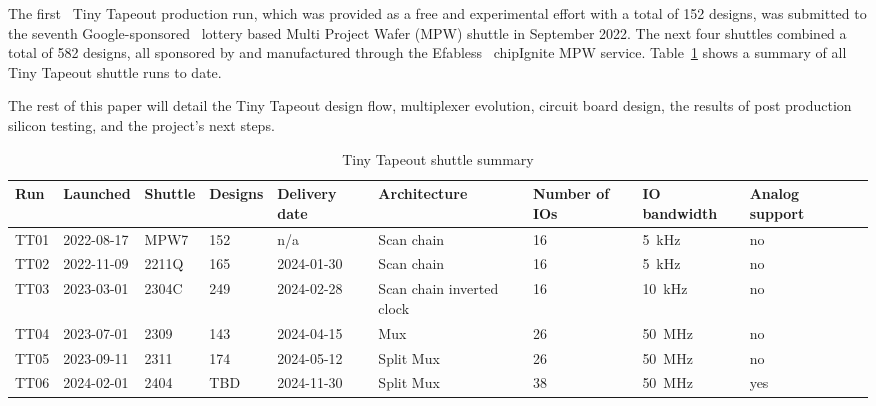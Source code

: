 The first~\cite{firstshuttle} Tiny Tapeout production run, which was provided as a free and experimental effort with a total of 152 designs, was submitted to the seventh Google-sponsored~\cite{googlesponsored} lottery based Multi Project Wafer (MPW) shuttle in September 2022.
The next four shuttles combined a total of 582 designs, all sponsored by and manufactured through the Efabless~\cite{efabless} chipIgnite MPW service. Table~\ref{tab:tinytapeout} shows a summary of all Tiny Tapeout shuttle runs to date.

The rest of this paper will detail the Tiny Tapeout design flow, multiplexer evolution, circuit board design, the results of post production silicon testing, and the project's next steps.

\begin{table}[!t]
\centering
\caption{Tiny Tapeout shuttle summary}
\label{tab:tinytapeout}
\begin{tabularx}{\textwidth}{@{}l *{9}{X}@{}}
\toprule
\textbf{Run} & \textbf{Launched} & \textbf{Shuttle} & \textbf{Designs} & \textbf{Delivery date} & \textbf{Architecture} & \textbf{Number of IOs} & \textbf{IO bandwidth} & \textbf{Analog support} \\
\midrule
TT01 & 2022-08-17  & MPW7  & 152 & n/a        & Scan chain                & 16 & \qty{5}{\kHz}    & no  \\
TT02 & 2022-11-09  & 2211Q & 165 & 2024-01-30 & Scan chain                & 16 & \qty{5}{\kHz}    & no  \\
TT03 & 2023-03-01  & 2304C & 249 & 2024-02-28 & Scan chain inverted clock & 16 & \qty{10}{\kHz}    & no  \\
TT04 & 2023-07-01  & 2309  & 143 & 2024-04-15 & Mux                       & 26 & \qty{50}{\MHz}   & no  \\
TT05 & 2023-09-11  & 2311  & 174 & 2024-05-12 & Split Mux                 & 26 & \qty{50}{\MHz}   & no  \\
TT06 & 2024-02-01  & 2404  & TBD & 2024-11-30 & Split Mux                 & 38 & \qty{50}{\MHz}   & yes \\
\bottomrule
\end{tabularx}
\end{table}

